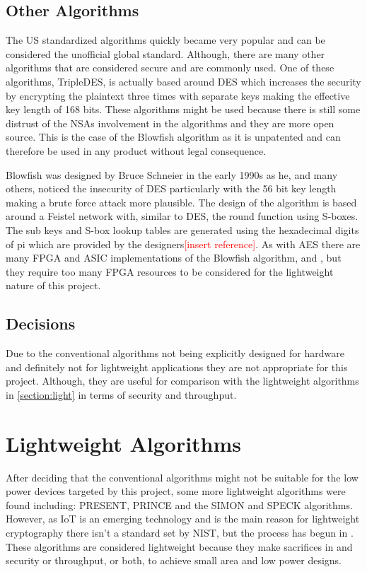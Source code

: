 \documentclass[12pt,twoside,a4paper]{report}
\begin{document}
	\subsection{Other Algorithms}
	The US standardized algorithms quickly became very popular and can be considered the unofficial global standard. Although, there are many other algorithms that are considered secure and are commonly used. One of these algorithms, TripleDES, is actually based around DES which increases the security by encrypting the plaintext three times with separate keys making the effective key length of 168 bits. These algorithms might be used because there is still some distrust of the NSAs involvement in the algorithms and they are more open source. This is the case of the Blowfish algorithm as it is unpatented and can therefore be used in any product without legal consequence.
    
	Blowfish was designed by Bruce Schneier in the early 1990s as he, and many others, noticed the insecurity of DES particularly with the 56 bit key length making a brute force attack more plausible\cite{BruceSchneier1994}. The design of the algorithm is based around a Feistel network with, similar to DES, the round function using S-boxes. The sub keys and S-box lookup tables are generated using the hexadecimal digits of pi which are provided by the designers\textcolor{red}{[insert reference]}. As with AES there are many FPGA and ASIC implementations of the Blowfish algorithm, \cite{Chatterjee2014} and \cite{Prasetyo2014}, but they require too many FPGA resources to be considered for the lightweight nature of this project.
    
	\subsection{Decisions}
	Due to the conventional algorithms not being explicitly designed for hardware and definitely not for lightweight applications they are not appropriate for this project. Although, they are useful for comparison with the lightweight algorithms in \autoref{section:light} in terms of security and throughput.
    
	\section{Lightweight Algorithms}
	\label{section:light}
	After deciding that the conventional algorithms might not be suitable for the low power devices targeted by this project, some more lightweight algorithms were found including: PRESENT\cite{Bogdanov2007}, PRINCE\cite{Borghoff2012} and the SIMON and SPECK algorithms\cite{Beaulieu2013}. However, as IoT is an emerging technology and is the main reason for lightweight cryptography there isn't a standard set by NIST, but the process has begun in \cite{Mckay}. These algorithms are considered lightweight because they make sacrifices in and security or throughput, or both, to achieve small area and low power designs.
    
\end{document}
